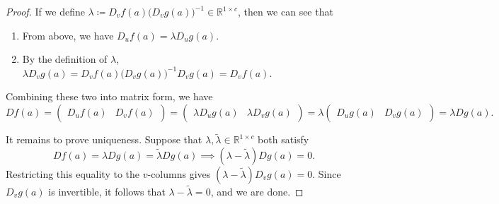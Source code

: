 \begin{proof}
		If we define $\lambda \coloneqq D_vf(a)\bigl(D_vg(a)\bigr)^{-1} \in\mathbb{R}^{1\times c}$, then we can see that 
		\begin{enumerate}
		  \item From above, we have $D_uf(a)=\lambda D_ug(a)$. 
			\item By the definition of $\lambda$, $\lambda D_vg(a) = D_vf(a)\bigl(D_vg(a)\bigr)^{-1}D_vg(a) = D_vf(a)$. 
		\end{enumerate}
		Combining these two into matrix form, we have 
		\begin{equation}
		  Df(a) = \begin{pmatrix} D_uf(a) & D_vf(a) \end{pmatrix} = \begin{pmatrix} \lambda D_ug(a) & \lambda D_vg(a) \end{pmatrix} = \lambda \begin{pmatrix} D_ug(a) & D_vg(a) \end{pmatrix} = \lambda Dg(a).
		\end{equation}

		It remains to prove uniqueness. Suppose that $\lambda,\widetilde{\lambda}\in\mathbb{R}^{1\times c}$ both satisfy
		\begin{equation}
			Df(a)=\lambda Dg(a)=\widetilde{\lambda}Dg(a) \implies (\lambda-\widetilde{\lambda})Dg(a)=0.
		\end{equation}
		Restricting this equality to the $v$-columns gives $(\lambda-\widetilde{\lambda})D_vg(a)=0$. Since $D_vg(a)$ is invertible, it follows that $\lambda-\widetilde{\lambda}=0$, and we are done. 
	\end{proof}

